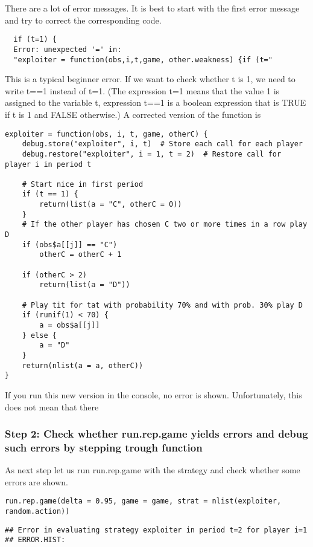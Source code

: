 \documentclass[]{article}
\begin{document}
There are a lot of error messages. It is best to start with the first
error message and try to correct the corresponding code.

\begin{verbatim}
  if (t=1) {
  Error: unexpected '=' in:
  "exploiter = function(obs,i,t,game, other.weakness) {if (t="
\end{verbatim}

This is a typical beginner error. If we want to check whether t is 1, we
need to write t==1 instead of t=1. (The expression t=1 means that the
value 1 is assigned to the variable t, expression t==1 is a boolean
expression that is TRUE if t is 1 and FALSE otherwise.) A corrected
version of the function is

\begin{verbatim}
exploiter = function(obs, i, t, game, otherC) {
    debug.store("exploiter", i, t)  # Store each call for each player
    debug.restore("exploiter", i = 1, t = 2)  # Restore call for player i in period t

    # Start nice in first period
    if (t == 1) {
        return(list(a = "C", otherC = 0))
    }
    # If the other player has chosen C two or more times in a row play D
    if (obs$a[[j]] == "C") 
        otherC = otherC + 1

    if (otherC > 2) 
        return(list(a = "D"))

    # Play tit for tat with probability 70% and with prob. 30% play D
    if (runif(1) < 70) {
        a = obs$a[[j]]
    } else {
        a = "D"
    }
    return(nlist(a = a, otherC))
}
\end{verbatim}

If you run this new version in the console, no error is shown.
Unfortunately, this does not mean that there

\subsubsection{Step 2: Check whether run.rep.game yields errors and
debug such errors by stepping trough function}

As next step let us run run.rep.game with the strategy and check whether
some errors are shown.

\begin{verbatim}
run.rep.game(delta = 0.95, game = game, strat = nlist(exploiter, random.action))
\end{verbatim}

\begin{verbatim}
## Error in evaluating strategy exploiter in period t=2 for player i=1
## ERROR.HIST:
\end{verbatim}
\end{document}
